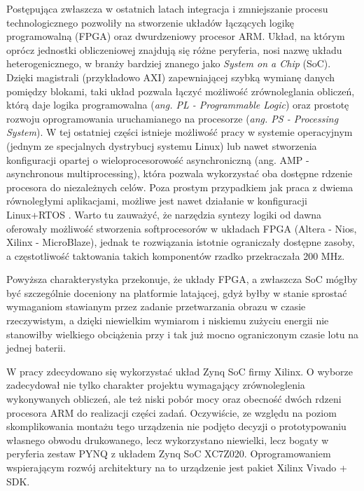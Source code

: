 Postępująca zwłaszcza w ostatnich latach integracja i zmniejszanie procesu technologicznego pozwoliły na stworzenie układów łączących logikę programowalną (FPGA) oraz dwurdzeniowy procesor ARM. 
Układ, na którym oprócz jednostki obliczeniowej znajdują się różne peryferia, nosi nazwę układu heterogenicznego, w branży bardziej znanego jako \textit{System on a Chip} (SoC). %
Dzięki magistrali (przykładowo AXI) zapewniającej szybką wymianę danych pomiędzy blokami, taki układ pozwala łączyć możliwość zrównoleglania obliczeń, którą daje logika programowalna (\textit{ang. PL - Programmable Logic}) oraz prostotę rozwoju oprogramowania uruchamianego na procesorze (\textit{ang. PS - Processing System}). 
W tej ostatniej części istnieje możliwość pracy w systemie operacyjnym (jednym ze specjalnych dystrybucj systemu Linux) lub nawet stworzenia konfiguracji opartej o wieloprocesorowość asynchroniczną (ang. AMP - asynchronous multiprocessing), która pozwala wykorzystać oba dostępne rdzenie procesora do niezależnych celów. Poza prostym przypadkiem jak praca z dwiema równoległymi aplikacjami, możliwe jest nawet działanie w konfiguracji Linux+RTOS \cite{AMP}. %
Warto tu zauważyć, że narzędzia syntezy logiki od dawna oferowały możliwość stworzenia softprocesorów w układach FPGA (Altera - Nios, Xilinx - MicroBlaze), jednak te rozwiązania istotnie ograniczały dostępne zasoby, a częstotliwość taktowania takich komponentów rzadko przekraczała 200 MHz. 

Powyższa charakterystyka przekonuje, że układy FPGA, a zwłaszcza SoC mógłby być szczególnie doceniony na platformie latającej, gdyż byłby w stanie sprostać wymaganiom stawianym przez zadanie przetwarzania obrazu w czasie rzeczywistym, a dzięki niewielkim wymiarom i niskiemu zużyciu energii nie stanowiłby wielkiego obciążenia przy i tak już mocno ograniczonym czasie lotu na jednej baterii. 

W pracy zdecydowano się wykorzystać układ Zynq SoC firmy Xilinx. O wyborze zadecydował nie tylko charakter projektu wymagający zrównoleglenia wykonywanych obliczeń, ale też niski pobór mocy oraz obecność dwóch rdzeni procesora ARM do realizacji części zadań.%
Oczywiście, ze względu na poziom skomplikowania montażu tego urządzenia nie podjęto decyzji o prototypowaniu własnego obwodu drukowanego, lecz wykorzystano niewielki, lecz bogaty w peryferia zestaw PYNQ z układem Zynq SoC XC7Z020. Oprogramowaniem wspierającym rozwój architektury na to urządzenie jest pakiet Xilinx Vivado + SDK.

